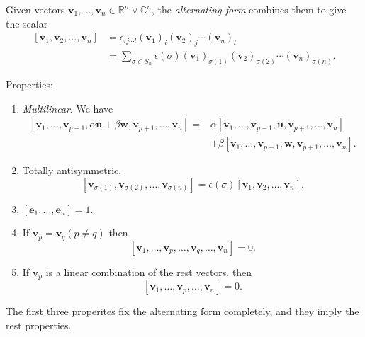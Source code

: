 \documentclass[a4paper]{article}
\begin{document}
    \begin{definition}
      Given vectors $ \mathbf{v}_1,\dots,\mathbf{v}_n \in
      \mathbb{R}^{n}\lor \mathbb{C}^{n} $, the \textit{alternating
      form} combines them to give the scalar
      \[
        \begin{aligned}
          [\mathbf{v}_1,\mathbf{v}_2,\dots,\mathbf{v}_n]&=
          \epsilon_{ij\cdots
          l}(\mathbf{v}_1)_{i}(\mathbf{v}_2)_j\cdots (\mathbf{v}_n)_l\\
          &= \sum_{\sigma\in
          S_n}\epsilon(\sigma)(\mathbf{v}_1)_{\sigma(1)}(\mathbf{v}_2)_{\sigma(2)}\cdots
          (\mathbf{v}_n)_{\sigma(n)}.
        \end{aligned}
      \]
    \end{definition}
    Properties:
    \begin{enumerate}
      \item \textit{Multilinear}. We have
        \[
          \begin{aligned}
            [\mathbf{v}_1,\dots,\mathbf{v}_{p-1},\alpha\mathbf{u}+\beta\mathbf{w},\mathbf{v}_{p+1},\dots,\mathbf{v}_n]=&\alpha[\mathbf{v}_1,\dots,\mathbf{v}_{p-1},\mathbf{u},\mathbf{v}_{p+1},\dots,\mathbf{v}_n]\\
            &+\beta[\mathbf{v}_1,\dots,\mathbf{v}_{p-1},\mathbf{w},\mathbf{v}_{p+1},\dots,\mathbf{v}_n].
          \end{aligned}
        \]
      \item Totally antisymmetric.
        \[
          [\mathbf{v}_{\sigma(1)},\mathbf{v}_{\sigma(2)},\dots,\mathbf{v}_{\sigma(n)}]=\epsilon(\sigma)[\mathbf{v}_1,\mathbf{v}_2,\dots,\mathbf{v}_n]
        .\]
      \item $ [\mathbf{e}_1,\dots,\mathbf{e}_n]=1 $.
      \item If $ \mathbf{v}_p=\mathbf{v}_q (p\neq q) $ then
        \[
          [\mathbf{v}_1,\dots,\mathbf{v}_p,\dots,\mathbf{v}_q,\dots,\mathbf{v}_n]=0
        .\]
      \item If $ \mathbf{v}_p $ is a linear combination of the rest
        vectors, then
        \[
          [\mathbf{v}_1,\dots,\mathbf{v}_p,\dots,\mathbf{v}_n]=0
        .\]
    \end{enumerate}
    The first three properites fix the alternating form completely,
    and they imply the rest properties.
\end{document}
